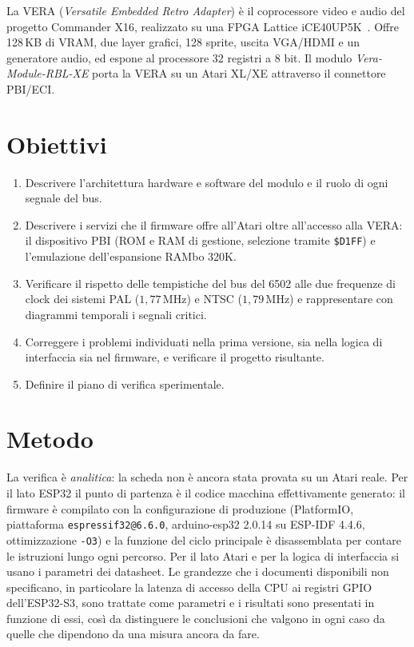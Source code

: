\documentclass[11pt,a4paper,twoside,openright]{report}
\newcommand{\MHz}{\,\mathrm{MHz}}
\DeclareRobustCommand{\code}[1]{\begingroup\renewcommand{\_}{\textunderscore\allowbreak}\texttt{#1}\endgroup}
\newcommand{\hex}[1]{\texttt{\$#1}}
\begin{document}
La VERA (\emph{Versatile Embedded Retro Adapter}) è il coprocessore video e audio del
progetto Commander X16, realizzato su una FPGA Lattice iCE40UP5K~\cite{vera}. Offre
128\,KB di VRAM, due layer grafici, 128 sprite, uscita VGA/HDMI e un generatore audio,
ed espone al processore 32 registri a 8 bit. Il modulo \emph{Vera-Module-RBL-XE} porta la
VERA su un Atari XL/XE attraverso il connettore PBI/ECI.

\section{Obiettivi}

\begin{enumerate}
  \item Descrivere l'architettura hardware e software del modulo e il ruolo di ogni
        segnale del bus.
  \item Descrivere i servizi che il firmware offre all'Atari oltre all'accesso alla VERA:
        il dispositivo PBI (ROM e RAM di gestione, selezione tramite \hex{D1FF}) e
        l'emulazione dell'espansione RAMbo 320K.
  \item Verificare il rispetto delle tempistiche del bus del 6502 alle due frequenze di
        clock dei sistemi PAL ($1{,}77\MHz$) e NTSC ($1{,}79\MHz$) e rappresentare con
        diagrammi temporali i segnali critici.
  \item Correggere i problemi individuati nella prima versione, sia nella logica di
        interfaccia sia nel firmware, e verificare il progetto risultante.
  \item Definire il piano di verifica sperimentale.
\end{enumerate}

\section{Metodo}

La verifica è \emph{analitica}: la scheda non è ancora stata provata su un Atari reale.
Per il lato ESP32 il punto di partenza è il codice macchina effettivamente generato: il
firmware è compilato con la configurazione di produzione (PlatformIO, piattaforma
\code{espressif32@6.6.0}, arduino-esp32 2.0.14 su ESP-IDF 4.4.6, ottimizzazione
\code{-O3}) e la funzione del ciclo principale è disassemblata per contare le istruzioni
lungo ogni percorso. Per il lato Atari e per la logica di interfaccia si usano i parametri
dei datasheet. Le grandezze che i documenti disponibili non specificano, in particolare la
latenza di accesso della CPU ai registri GPIO dell'ESP32-S3, sono trattate come parametri e
i risultati sono presentati in funzione di essi, così da distinguere le conclusioni che
valgono in ogni caso da quelle che dipendono da una misura ancora da fare.
\end{document}
